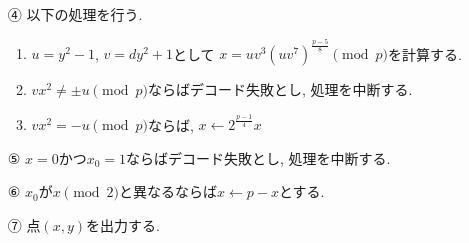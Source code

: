\begin{enumerate}
\begin{enumerate}
    \item[④　] 以下の処理を行う.
    \begin{enumerate}
      \item $u=y^2-1$, $v=dy^2+1$として
      $x=uv^3(uv^7)^{\tfrac{p-5}{8}}\pmod p$を計算する.
      \item $vx^2 \neq \pm  u \pmod p$ならばデコード失敗とし, 処理を中断する.
      \item $vx^2=-u \pmod p$ならば, $x\leftarrow 2^{\tfrac{p-1}{4}}x$
    \end{enumerate}
    \item[⑤　] $x=0$かつ$x_0=1$ならばデコード失敗とし, 処理を中断する.
    \item[⑥　] $x_0$が$x \pmod 2$と異なるならば$x\leftarrow p-x$とする.
    \item[⑦　] 点$(x,y)$を出力する.
  \end{enumerate}
\end{enumerate}

